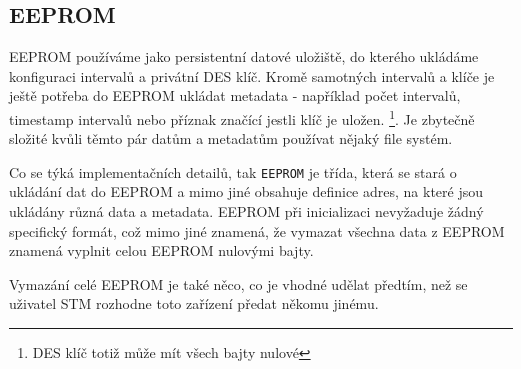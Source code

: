 
\subsection{EEPROM}
EEPROM používáme jako persistentní datové uložiště, do kterého ukládáme konfiguraci intervalů
a privátní DES klíč.
Kromě samotných intervalů a klíče je ještě potřeba do EEPROM ukládat metadata -
například počet intervalů, timestamp intervalů nebo příznak značící jestli klíč je uložen.
\footnote{DES klíč totiž může mít všech bajty nulové}.
Je zbytečně složité kvůli těmto pár datům a metadatům používat nějaký file systém.

Co se týká implementačních detailů, tak \texttt{EEPROM} je třída, která se stará o ukládání
dat do EEPROM a mimo jiné obsahuje definice adres, na které jsou ukládány různá data a metadata.
EEPROM při inicializaci nevyžaduje žádný specifický formát, což mimo jiné znamená, že vymazat
všechna data z EEPROM znamená vyplnit celou EEPROM nulovými bajty.

Vymazání celé EEPROM je také něco, co je vhodné udělat předtím, než se uživatel STM rozhodne
toto zařízení předat někomu jinému.

